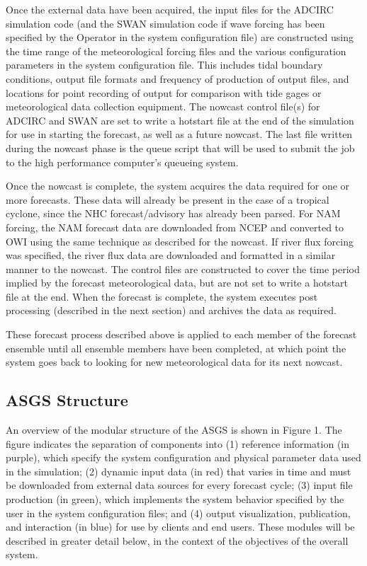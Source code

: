 \documentclass[12pt]{article}
\begin{document}
Once the external data have been acquired, the input files for the 
ADCIRC simulation code (and the SWAN simulation code if wave forcing 
has been specified by the Operator in the system configuration file) 
are constructed using the time range of the meteorological forcing 
files and the various configuration parameters in the system 
configuration file. This includes tidal boundary conditions, output 
file formats and frequency of production of output files, and 
locations for point recording of output for comparison with tide 
gages or meteorological data collection equipment. The nowcast 
control file(s) for ADCIRC and SWAN are set to write a hotstart file 
at the end of the simulation for use in starting the forecast, as 
well as a future nowcast. The last file written during the nowcast 
phase is the queue script that will be used to submit the job to the 
high performance computer's queueing system.

Once the nowcast is complete, the system acquires the data required 
for one or more forecasts. These data will already be present in the 
case of a tropical cyclone, since the NHC forecast/advisory has 
already been parsed. For NAM forcing, the NAM forecast data are 
downloaded from NCEP and converted to OWI using the same technique 
as described for the nowcast. If river flux forcing was specified, 
the river flux data are downloaded and formatted in a similar manner 
to the nowcast. The control files are constructed to cover the time 
period implied by the forecast meteorological data, but are not set 
to write a hotstart file at the end. When the forecast is complete, 
the system executes post processing (described in the next section) 
and archives the data as required. 

These forecast process described above is applied to  each member of 
the forecast ensemble until all ensemble members have been 
completed, at which point the system goes back to looking for new 
meteorological data for its next nowcast.


\subsection{ASGS Structure}

An overview of the modular structure of the ASGS is shown in Figure 
1. The figure indicates the separation of components into (1) 
reference information (in purple), which specify the system 
configuration and physical parameter data used in the simulation; 
(2) dynamic input data (in red) that varies in time and must be 
downloaded from external data sources for every forecast cycle; (3) 
input file production (in green), which implements the system 
behavior specified by the user in the system configuration files; 
and (4) output visualization, publication, and interaction (in blue) 
for use by clients and end users. These modules will be described in 
greater detail below, in the context of the objectives of the
overall system. 
\end{document}
